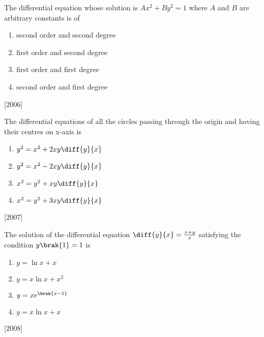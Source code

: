 \iffalse
\title{Assignment}
\author{M.Ranjith}
\section{mcq-single}
\fi
\item The differential equation whose solution is $Ax^2 + By^2 = 1$ where $A$ and $B$ are arbitrary constants is of 



\begin{multicols}{2}
\begin{enumerate}
    \item second order and second degree 
    \item first order and second degree 
    \item first order and first degree 
    \item second order and first degree 

\end{enumerate}
\end{multicols}
\hfill
{[2006]}
\item The differential equations of all the circles passing through the origin and having their centres on x-axis is
\begin{multicols}{2}
\begin{enumerate}
\item $ y^2=x^2 + 2xy\diff{y}{x} $
\item $ y^2=x^2 - 2xy\diff{y}{x}$
\item $ x^2=y^2 + xy\diff{y}{x}$
\item $ x^2 =y^2 + 3xy\diff{y}{x}$
\end{enumerate}
\end{multicols}
\hfill
{{[2007]}}




\item The solution of the differential equation $ \diff{y}{x}=\frac{x+y}{x}$ satisfying the condition $ y\brak{1}=1 $ is
  \begin{multicols}{2}
    \begin{enumerate}
    \item $ y=  \ln{x}+x $
    \item $y=x\ln{x}+x^2$
    \item $ y=xe^{\brak{x-1}} $
    \item $ y=x \ln{x}+ x$
       \end{enumerate}
   \end{multicols}
\hfill
{[2008]}


